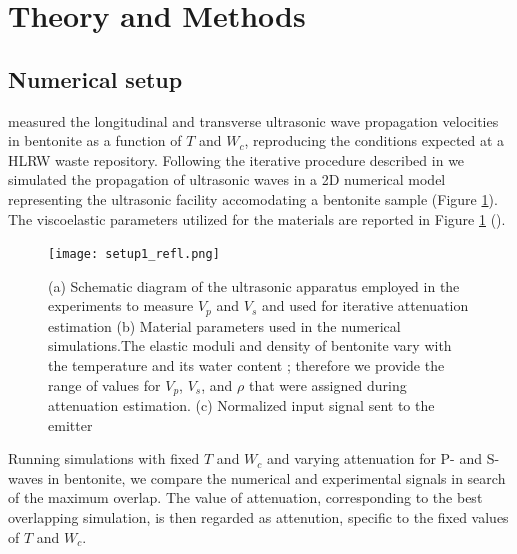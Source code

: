 \documentclass[letterpaper,11pt]{article}
\begin{document}


\section*{Theory and Methods}
\subsection*{Numerical setup}
\citet{tisato_laboratory_2013} measured the longitudinal and transverse ultrasonic wave propagation velocities in bentonite as a function of $T$ and $W_{c}$, reproducing the conditions expected at a HLRW waste repository. Following the iterative procedure described in \citet{abiryukov_2014} we simulated the propagation of ultrasonic waves in a 2D numerical model representing the ultrasonic facility accomodating a bentonite sample (Figure \ref{fig:setup}). The viscoelastic parameters utilized for the materials are reported in Figure \ref{fig:setup} (\citet{lakes_viscoelastic_2009,auerkari_mechanical_1996,boyer_metals_1984}).
\begin{figure}
\texttt{[image: setup1\_refl.png]}
 \caption{(a) Schematic diagram of the ultrasonic apparatus employed in the experiments to measure $V_{p}$ and $V_{s}$ and used for iterative attenuation estimation (b) Material parameters used in the numerical simulations.The elastic moduli and density of bentonite vary with the temperature and its water content \citet{tisato_laboratory_2013}; therefore we provide the range of values for $V_{p}$, $V_{s}$, and $\rho$ that were assigned during attenuation estimation. (c) Normalized input signal sent to the emitter}
 \label{fig:setup}
 \end{figure}
Running simulations with fixed $T$ and $W_{c}$ and varying attenuation for P- and S-waves in bentonite, we compare the numerical and experimental signals in search of the maximum overlap. The value of attenuation, corresponding to the best overlapping simulation, is then regarded as attenution, specific to the fixed values of $T$ and $W_{c}$.
\end{document}
